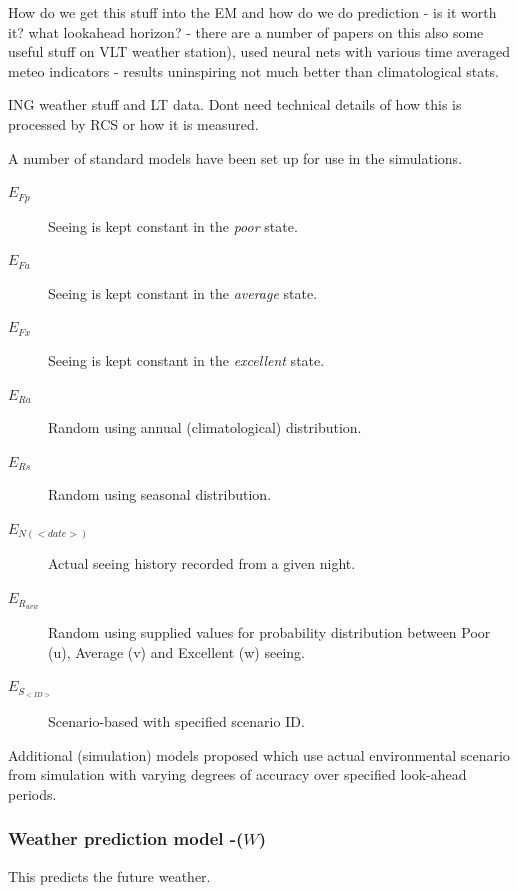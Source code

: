 How do we get this stuff into the EM and how do we do prediction - is it worth it? what lookahead horizon? - there are a number of papers on this  \cite{aussem94dynamical,aussem94fuzzy,sarazin97automated,aussem02online,racine96temporal} also some useful stuff on VLT weather station), used neural nets with various time averaged meteo indicators - results uninspiring not much better than climatological stats. 

ING weather stuff and LT data. Dont need technical details of how this is processed by RCS or how it is measured. 

A number of standard models have been set up for use in the simulations.

\begin{description}
\item[ $E_{Fp}$] Seeing is kept constant in the \emph{poor} state.
\item[ $E_{Fa}$] Seeing is kept constant in the \emph{average} state.
\item[ $E_{Fx}$] Seeing is kept constant in the \emph{excellent} state.
\item[ $E_{Ra}$] Random using annual (climatological) distribution. 
\item[ $E_{Rs}$] Random using seasonal distribution.
\item[ $E_{N(<date>)}$] Actual seeing history recorded from a given night. 
\item[ $E_{R_{uvw}}$] Random using supplied values for probability distribution between Poor (u), Average (v) and Excellent (w) seeing.
\item[ $E_{S_{<ID>}}$] Scenario-based with specified scenario ID.
\end{description}

Additional (simulation) models proposed which use actual environmental scenario from simulation with varying degrees of accuracy over specified look-ahead periods.

\subsubsection{Weather prediction model -($W$)} 
This predicts the future weather. 

